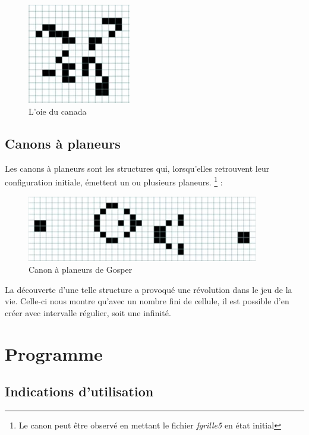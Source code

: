 \documentclass[12,french]{report}
\begin{document}
\begin{figure}[H]
	\center
	\includegraphics[width=0.4\textwidth]{./Images/15}
	\caption{L'oie du canada}
\end{figure}\vspace{0.1cm}

\section{Canons à planeurs}

Les canons à planeurs sont les structures qui, lorsqu'elles retrouvent leur configuration initiale, émettent un ou plusieurs planeurs. \footnote{Le canon peut être observé en mettant le fichier \textit{fgrille5} en état initial} : \vspace{0.3cm}

\begin{figure}[H]
	\center
	\includegraphics[width=0.9\textwidth]{./Images/16}
	\caption{Canon à planeurs de Gosper}
\end{figure}\vspace{0.1cm}

La découverte d'une telle structure a provoqué une révolution dans le jeu de la vie. Celle-ci nous montre qu'avec un nombre fini de cellule, il est possible d'en créer avec intervalle régulier, soit une infinité.

\chapter{Programme}
\section{Indications d'utilisation}
\end{document}
